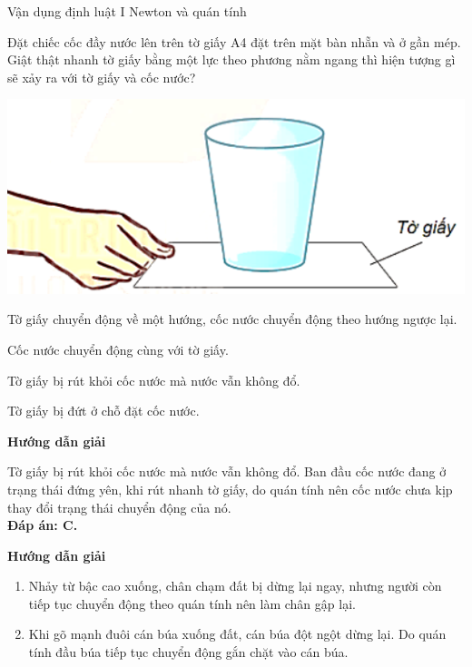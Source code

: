 \begin{dang}{Vận dụng định luật I Newton và quán tính}
	{Đặt chiếc cốc đầy nước lên trên tờ giấy A4 đặt trên mặt bàn nhẵn và ở gần mép. Giật thật nhanh tờ giấy bằng một lực theo phương nằm ngang thì hiện tượng gì sẽ xảy ra với tờ giấy và cốc nước?
		\begin{center}
			\includegraphics[width=0.3\linewidth]{../figs/VN10-2023-PH-TP015-4}
		\end{center}
	\begin{mcq}
		\item Tờ giấy chuyển động về một hướng, cốc nước chuyển động theo hướng ngược lại.
		\item Cốc nước chuyển động cùng với tờ giấy.
		\item Tờ giấy bị rút khỏi cốc nước mà nước vẫn không đổ.
		\item Tờ giấy bị đứt ở chỗ đặt cốc nước.
\end{mcq}}
	{\begin{center}
			\textbf{Hướng dẫn giải}
		\end{center}
	Tờ giấy bị rút khỏi cốc nước mà nước vẫn không đổ. Ban đầu cốc nước đang ở trạng thái đứng yên, khi rút nhanh tờ giấy, do quán tính nên cốc nước chưa kịp thay đổi trạng thái chuyển động của nó.\\
	\textbf{Đáp án: C.}
}
	{	\begin{center}
			\textbf{Hướng dẫn giải}
		\end{center}
		
		\begin{enumerate}[label=\alph*.]
			\item Nhảy từ bậc cao xuống, chân chạm đất bị dừng lại ngay, nhưng người còn tiếp tục chuyển động theo quán tính nên làm chân gập lại.  	
			\item Khi gõ mạnh đuôi cán búa xuống đất, cán búa đột ngột dừng lại. Do quán tính đầu búa tiếp tục chuyển động gắn chặt vào cán búa. 
		\end{enumerate}
	}
\end{dang}
